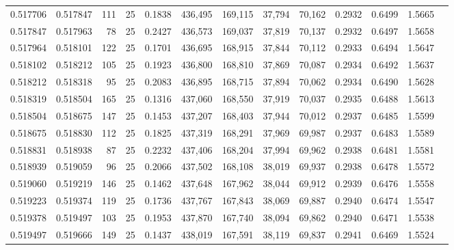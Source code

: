 \begin{tabular}{rrrrrrrrrrrrr}
0.517706 & 0.517847 &   111 &  25 &                                     0.1838 & 436,495 & 169,115 &  37,794 &  70,162 & 0.2932 & 0.6499 & 1.5665 \\
0.517847 & 0.517963 &    78 &  25 &                                     0.2427 & 436,573 & 169,037 &  37,819 &  70,137 & 0.2932 & 0.6497 & 1.5658 \\
0.517964 & 0.518101 &   122 &  25 &                                     0.1701 & 436,695 & 168,915 &  37,844 &  70,112 & 0.2933 & 0.6494 & 1.5647 \\
0.518102 & 0.518212 &   105 &  25 &                                     0.1923 & 436,800 & 168,810 &  37,869 &  70,087 & 0.2934 & 0.6492 & 1.5637 \\
0.518212 & 0.518318 &    95 &  25 &                                     0.2083 & 436,895 & 168,715 &  37,894 &  70,062 & 0.2934 & 0.6490 & 1.5628 \\
0.518319 & 0.518504 &   165 &  25 &                                     0.1316 & 437,060 & 168,550 &  37,919 &  70,037 & 0.2935 & 0.6488 & 1.5613 \\
0.518504 & 0.518675 &   147 &  25 &                                     0.1453 & 437,207 & 168,403 &  37,944 &  70,012 & 0.2937 & 0.6485 & 1.5599 \\
0.518675 & 0.518830 &   112 &  25 &                                     0.1825 & 437,319 & 168,291 &  37,969 &  69,987 & 0.2937 & 0.6483 & 1.5589 \\
0.518831 & 0.518938 &    87 &  25 &                                     0.2232 & 437,406 & 168,204 &  37,994 &  69,962 & 0.2938 & 0.6481 & 1.5581 \\
0.518939 & 0.519059 &    96 &  25 &                                     0.2066 & 437,502 & 168,108 &  38,019 &  69,937 & 0.2938 & 0.6478 & 1.5572 \\
0.519060 & 0.519219 &   146 &  25 &                                     0.1462 & 437,648 & 167,962 &  38,044 &  69,912 & 0.2939 & 0.6476 & 1.5558 \\
0.519223 & 0.519374 &   119 &  25 &                                     0.1736 & 437,767 & 167,843 &  38,069 &  69,887 & 0.2940 & 0.6474 & 1.5547 \\
0.519378 & 0.519497 &   103 &  25 &                                     0.1953 & 437,870 & 167,740 &  38,094 &  69,862 & 0.2940 & 0.6471 & 1.5538 \\
0.519497 & 0.519666 &   149 &  25 &                                     0.1437 & 438,019 & 167,591 &  38,119 &  69,837 & 0.2941 & 0.6469 & 1.5524 \\

\end{tabular}
